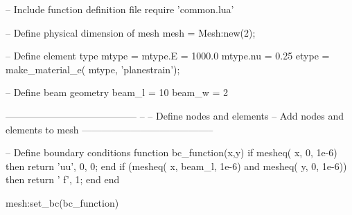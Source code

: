 -- Include function definition file
require 'common.lua'

-- Define physical dimension of mesh
mesh = Mesh:new(2);

-- Define element type
mtype     = {}
mtype.E   =  1000.0
mtype.nu  =    0.25
etype = make_material_e( mtype, 'planestrain');

-- Define beam geometry
beam_l = 10
beam_w =  2

-----------------------------------------
--
-- Define nodes and elements
-- Add nodes and elements to mesh
-----------------------------------------

-- Define boundary conditions
function bc_function(x,y)
  if mesheq( x, 0, 1e-6) then
     return 'uu', 0, 0;
  end
  if (mesheq( x, beam_l, 1e-6) and mesheq( y, 0, 1e-6)) then
     return ' f', 1;
  end
end

mesh:set_bc(bc_function)
